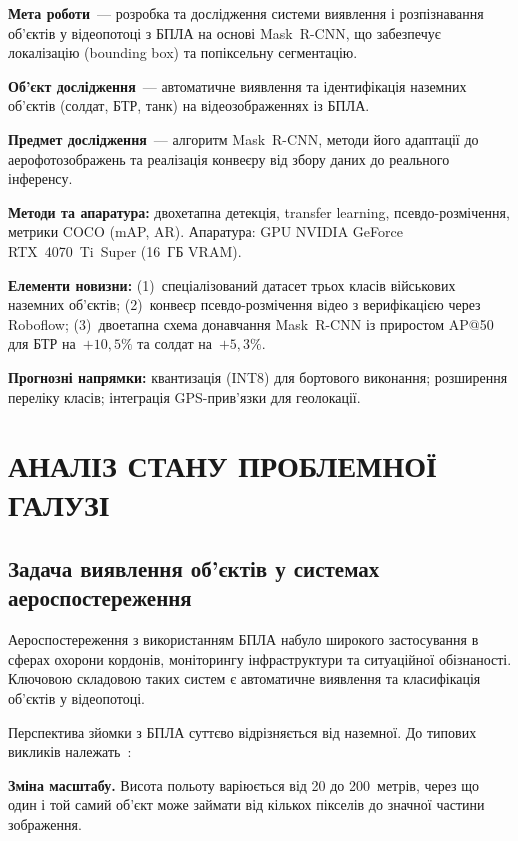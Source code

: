 \documentclass[14pt,a4paper]{extreport}
\begin{document}
\textbf{Мета роботи}~--- розробка та дослідження системи виявлення і
розпізнавання об'єктів у відеопотоці з БПЛА на основі Mask~R-CNN,
що забезпечує локалізацію (bounding box) та попіксельну сегментацію.

\textbf{Об'єкт дослідження}~--- автоматичне виявлення та ідентифікація
наземних об'єктів (солдат, БТР, танк) на відеозображеннях із БПЛА.

\textbf{Предмет дослідження}~--- алгоритм Mask~R-CNN, методи його
адаптації до аерофотозображень та реалізація конвеєру від збору даних
до реального інференсу.

\textbf{Методи та апаратура:} двохетапна детекція, transfer learning,
псевдо-розмічення, метрики COCO (mAP, AR). Апаратура: GPU NVIDIA GeForce
RTX~4070~Ti~Super (16~ГБ VRAM).

\textbf{Елементи новизни:} (1)~спеціалізований датасет трьох класів
військових наземних об'єктів; (2)~конвеєр псевдо-розмічення відео з
верифікацією через Roboflow; (3)~двоетапна схема донавчання Mask~R-CNN
із приростом AP@50 для БТР на~$+10{,}5\%$ та солдат на~$+5{,}3\%$.

\textbf{Прогнозні напрямки:} квантизація (INT8) для бортового виконання;
розширення переліку класів; інтеграція GPS-прив'язки для геолокації.

\chapter{АНАЛІЗ СТАНУ ПРОБЛЕМНОЇ ГАЛУЗІ}

\section{Задача виявлення об'єктів у системах аероспостереження}

Аероспостереження з використанням БПЛА набуло широкого застосування в
сферах охорони кордонів, моніторингу інфраструктури та ситуаційної
обізнаності. Ключовою складовою таких систем є автоматичне виявлення та
класифікація об'єктів у відеопотоці.

Перспектива зйомки з БПЛА суттєво відрізняється від наземної. До
типових викликів належать~\cite{liuUAVYOLO2020, azimiTracking2020}:

\textbf{Зміна масштабу.} Висота польоту варіюється від 20 до 200~метрів,
через що один і той самий об'єкт може займати від кількох пікселів до
значної частини зображення.
\end{document}
